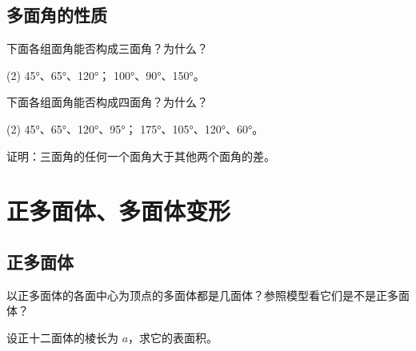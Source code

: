 \subsection{多面角的性质}
\begin{Practice}
  \begin{question}
    \item 下面各组面角能否构成三面角？为什么？
    \begin{tasks}(2)
      \task \ang{45}、\ang{65}、\ang{120}；
      \task \ang{100}、\ang{90}、\ang{150}。
    \end{tasks}
    \item 下面各组面角能否构成四面角？为什么？
    \begin{tasks}(2)
      \task \ang{45}、\ang{65}、\ang{120}、\ang{95}；
      \task \ang{175}、\ang{105}、\ang{120}、\ang{60}。
    \end{tasks}
    \item 证明：三面角的任何一个面角大于其他两个面角的差。
  \end{question}
\end{Practice}
\begin{Exercise}
  \begin{question}
    \item 
    \item 
    \item 
    \item 
    \item 
    \item 
    \item 
    \item 
  \end{question}
\end{Exercise}

\section{正多面体、多面体变形}
\subsection{正多面体}
\begin{Practice}
  \begin{question}
    \item 以正多面体的各面中心为顶点的多面体都是几面体？参照模型看它们是不是正多面体？
    \item 设正十二面体的棱长为 $a$，求它的表面积。
  \end{question}
\end{Practice}
